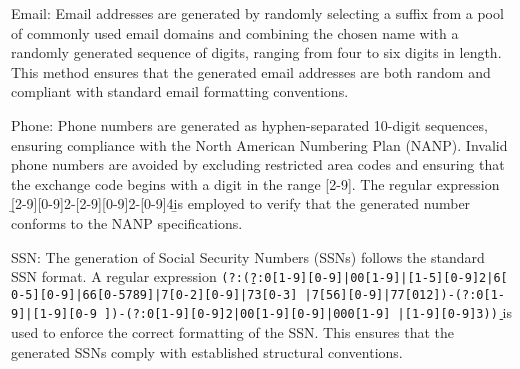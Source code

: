 Email: Email addresses are generated by randomly selecting a suffix from a pool of commonly used email domains and combining the chosen name with a randomly generated sequence of digits, ranging from four to six digits in length. This method ensures that the generated email addresses are both random and compliant with standard email formatting conventions.

Phone: Phone numbers are generated as hyphen-separated 10-digit sequences, ensuring compliance with the North American Numbering Plan (NANP). Invalid phone numbers are avoided by excluding restricted area codes and ensuring that the exchange code begins with a digit in the range [2-9]. The regular expression \b[2-9][0-9]{2}-[2-9][0-9]{2}-[0-9]{4}\b is employed to verify that the generated number conforms to the NANP specifications.

SSN: The generation of Social Security Numbers (SSNs) follows the standard SSN format. A regular expression \texttt{(?:\b(?:0[1-9][0-9]|00[1-9]|[1-5][0-9]{2}|6[
0-5][0-9]|66[0-5789]|7[0-2][0-9]|73[0-3]
|7[56][0-9]|77[012])-(?:0[1-9]|[1-9][0-9
])-(?:0[1-9][0-9]{2}|00[1-9][0-9]|000[1-9]
|[1-9][0-9]{3})\b)} is used to enforce the correct formatting of the SSN. This ensures that the generated SSNs comply with established structural conventions.






% 

